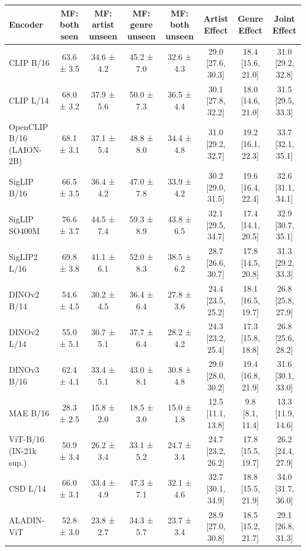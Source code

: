 \begin{tabular}{lccccccc}
\toprule
Encoder & MF: both seen & MF: artist unseen & MF: genre unseen & MF: both unseen & Artist Effect & Genre Effect & Joint Effect \\
\midrule
CLIP B/16 & 63.6 ± 3.5 & 34.6 ± 4.2 & 45.2 ± 7.0 & 32.6 ± 4.3 & 29.0 [27.6, 30.3] & 18.4 [15.6, 21.0] & 31.0 [29.2, 32.8] \\
CLIP L/14 & 68.0 ± 3.2 & 37.9 ± 5.6 & 50.0 ± 7.3 & 36.5 ± 4.4 & 30.1 [27.8, 32.2] & 18.0 [14.6, 21.0] & 31.5 [29.5, 33.3] \\
OpenCLIP B/16 (LAION-2B) & 68.1 ± 3.1 & 37.1 ± 5.4 & 48.8 ± 8.0 & 34.4 ± 4.8 & 31.0 [29.2, 32.7] & 19.2 [16.1, 22.3] & 33.7 [32.1, 35.1] \\
SigLIP B/16 & 66.5 ± 3.5 & 36.4 ± 4.2 & 47.0 ± 7.8 & 33.9 ± 4.2 & 30.2 [29.0, 31.5] & 19.6 [16.4, 22.4] & 32.6 [31.1, 34.1] \\
SigLIP SO400M & 76.6 ± 3.7 & 44.5 ± 7.4 & 59.3 ± 8.9 & 43.8 ± 6.5 & 32.1 [29.5, 34.7] & 17.4 [14.1, 20.5] & 32.9 [30.7, 35.1] \\
SigLIP2 L/16 & 69.8 ± 3.8 & 41.1 ± 6.1 & 52.0 ± 8.3 & 38.5 ± 6.2 & 28.7 [26.6, 30.7] & 17.8 [14.5, 20.8] & 31.3 [29.2, 33.3] \\
DINOv2 B/14 & 54.6 ± 4.5 & 30.2 ± 4.5 & 36.4 ± 6.4 & 27.8 ± 3.6 & 24.4 [23.5, 25.2] & 18.1 [16.5, 19.7] & 26.8 [25.8, 27.9] \\
DINOv2 L/14 & 55.0 ± 5.1 & 30.7 ± 5.1 & 37.7 ± 6.4 & 28.2 ± 4.2 & 24.3 [23.2, 25.4] & 17.3 [15.8, 18.8] & 26.8 [25.6, 28.2] \\
DINOv3 B/16 & 62.4 ± 4.1 & 33.4 ± 5.1 & 43.0 ± 8.1 & 30.8 ± 4.8 & 29.0 [28.0, 30.2] & 19.4 [16.8, 21.9] & 31.6 [30.1, 33.0] \\
MAE B/16 & 28.3 ± 2.5 & 15.8 ± 2.0 & 18.5 ± 3.0 & 15.0 ± 1.8 & 12.5 [11.1, 13.8] & 9.8 [8.1, 11.4] & 13.3 [11.9, 14.6] \\
ViT-B/16 (IN-21k sup.) & 50.9 ± 3.4 & 26.2 ± 3.4 & 33.1 ± 5.2 & 24.7 ± 3.4 & 24.7 [23.2, 26.2] & 17.8 [15.5, 19.7] & 26.2 [24.4, 27.9] \\
CSD L/14 & 66.0 ± 3.1 & 33.4 ± 4.9 & 47.3 ± 7.1 & 32.1 ± 4.6 & 32.7 [30.1, 34.9] & 18.8 [15.5, 21.9] & 34.0 [31.7, 36.0] \\
ALADIN-ViT & 52.8 ± 3.0 & 23.8 ± 2.7 & 34.3 ± 5.7 & 23.7 ± 3.4 & 28.9 [27.0, 30.8] & 18.5 [15.2, 21.7] & 29.1 [26.8, 31.3] \\
\bottomrule
\end{tabular}
